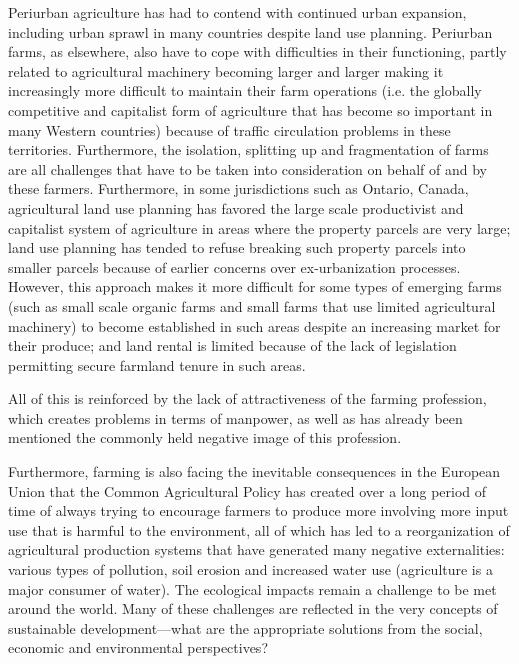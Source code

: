 \documentclass[10pt,a4paper]{article}
\begin{document}
\begin{multicols}{2}
Periurban agriculture has had to contend with continued urban expansion, including urban sprawl in many countries despite land use planning. Periurban farms, as elsewhere, also have to cope with difficulties in their functioning, partly related to agricultural machinery becoming larger and larger making it increasingly more difficult to maintain their farm operations (i.e. the globally competitive and capitalist form of agriculture that has become so important in many Western countries) because of traffic circulation problems in these territories. Furthermore, the isolation, splitting up and fragmentation of farms are all challenges that have to be taken into consideration on behalf of and by these farmers. Furthermore, in some jurisdictions such as Ontario, Canada, agricultural land use planning has favored the large scale productivist and capitalist system of agriculture in areas where the property parcels are very large; land use planning has tended to refuse breaking such property parcels into smaller parcels because of earlier concerns over ex-urbanization processes. However, this approach makes it more difficult for some types of emerging farms (such as small scale organic farms and small farms that use limited agricultural machinery) to become established in such areas despite an increasing market for their produce; and land rental is limited because of the lack of legislation permitting secure farmland tenure in such areas.


All of this is reinforced by the lack of attractiveness of the farming profession, which creates problems in terms of manpower, as well as has already been mentioned the commonly held negative image of this profession.


Furthermore, farming is also facing the inevitable consequences in the European Union that the Common Agricultural Policy has created over a long period of time of always trying to encourage farmers to produce more involving more input use that is harmful to the environment, all of which has led to a reorganization of agricultural production systems that have generated many negative externalities: various types of pollution, soil erosion and increased water use (agriculture is a major consumer of water). The ecological impacts remain a challenge to be met around the world. Many of these challenges are reflected in the very concepts of sustainable development---what are the appropriate solutions from the social, economic and environmental perspectives? 


\end{multicols}
\end{document}
